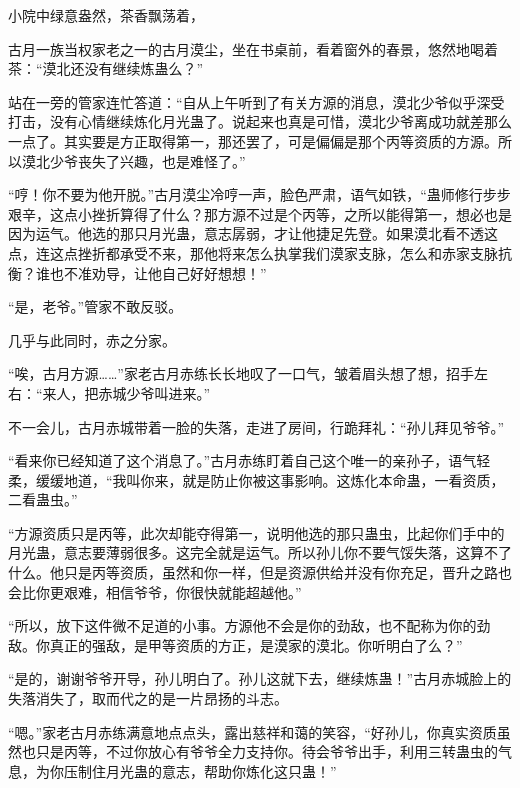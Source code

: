 \begin{this_body}
小院中绿意盎然，茶香飘荡着，

古月一族当权家老之一的古月漠尘，坐在书桌前，看着窗外的春景，悠然地喝着茶：“漠北还没有继续炼蛊么？”

站在一旁的管家连忙答道：“自从上午听到了有关方源的消息，漠北少爷似乎深受打击，没有心情继续炼化月光蛊了。说起来也真是可惜，漠北少爷离成功就差那么一点了。其实要是方正取得第一，那还罢了，可是偏偏是那个丙等资质的方源。所以漠北少爷丧失了兴趣，也是难怪了。”

“哼！你不要为他开脱。”古月漠尘冷哼一声，脸色严肃，语气如铁，“蛊师修行步步艰辛，这点小挫折算得了什么？那方源不过是个丙等，之所以能得第一，想必也是因为运气。他选的那只月光蛊，意志孱弱，才让他捷足先登。如果漠北看不透这点，连这点挫折都承受不来，那他将来怎么执掌我们漠家支脉，怎么和赤家支脉抗衡？谁也不准劝导，让他自己好好想想！”

“是，老爷。”管家不敢反驳。

几乎与此同时，赤之分家。

“唉，古月方源……”家老古月赤练长长地叹了一口气，皱着眉头想了想，招手左右：“来人，把赤城少爷叫进来。”

不一会儿，古月赤城带着一脸的失落，走进了房间，行跪拜礼：“孙儿拜见爷爷。”

“看来你已经知道了这个消息了。”古月赤练盯着自己这个唯一的亲孙子，语气轻柔，缓缓地道，“我叫你来，就是防止你被这事影响。这炼化本命蛊，一看资质，二看蛊虫。”

“方源资质只是丙等，此次却能夺得第一，说明他选的那只蛊虫，比起你们手中的月光蛊，意志要薄弱很多。这完全就是运气。所以孙儿你不要气馁失落，这算不了什么。他只是丙等资质，虽然和你一样，但是资源供给并没有你充足，晋升之路也会比你更艰难，相信爷爷，你很快就能超越他。”

“所以，放下这件微不足道的小事。方源他不会是你的劲敌，也不配称为你的劲敌。你真正的强敌，是甲等资质的方正，是漠家的漠北。你听明白了么？”

“是的，谢谢爷爷开导，孙儿明白了。孙儿这就下去，继续炼蛊！”古月赤城脸上的失落消失了，取而代之的是一片昂扬的斗志。

“嗯。”家老古月赤练满意地点点头，露出慈祥和蔼的笑容，“好孙儿，你真实资质虽然也只是丙等，不过你放心有爷爷全力支持你。待会爷爷出手，利用三转蛊虫的气息，为你压制住月光蛊的意志，帮助你炼化这只蛊！”

\end{this_body}

